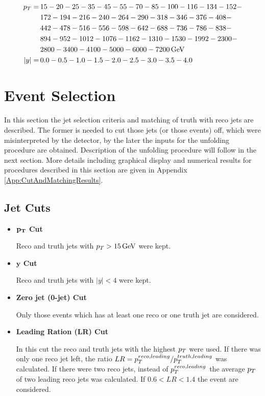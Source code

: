 \begin{align}
  p_{T} = \, &15-20-25-35-45-55-70-85-100-116-134-152- \nonumber \\
        &172-194-216-240-264-290-318-346-376-408- \nonumber \\
        &442-478-516-556-598-642-688-736-786-838- \nonumber \\
        &894-952-1012-1076-1162-1310-1530-1992-2300- \nonumber \\
        &2800-3400-4100-5000-6000-7200 \,\text{GeV} \nonumber \\
  |y| = \, &0.0-0.5-1.0-1.5-2.0-2.5-3.0-3.5-4.0
  \label{eq:Binning}
\end{align}

\section{Event Selection}

In this section the jet selection criteria and matching of truth with reco
jets are described. The former is needed to cut those jets (or those events)
off, which were misinterpreted by the detector, by the later the inputs for the
unfolding procedure are obtained. Description of the unfolding procedure will
follow in the next section. More details including graphical display and
numerical results for procedures described in this section are given in Appendix
\ref{App:CutAndMatchingResults}.

\subsection{Jet Cuts}
\label{SubSec:JetCuts}

\begin{itemize}
  \item \textbf{$\mathbf{p_{T}}$ Cut}

    Reco and truth jets with $p_{T} > 15 \,\text{GeV}$ were kept.

  \item \textbf{$\mathbf{y}$ Cut}
    
    Reco and truth jets with $|y| < 4$ were kept.

  \item \textbf{Zero jet (0-jet) Cut}

    Only those events which has at least one reco or one truth jet are
    considered.
    
  \item \textbf{Leading Ration (LR) Cut}

    In this cut the reco and truth jets with the highest $p_{T}$ were used. If
    there was only one reco jet left, the ratio $LR = p_{T}^{reco,leading} /
    p_{T}^{truth,leading}$ was calculated. If there were two reco jets, instead
    of $p_{T}^{reco,leading}$ the average $p_{T}$ of two leading reco jets was
    calculated. If $0.6 < LR < 1.4$ the event are considered.

\end{itemize}

